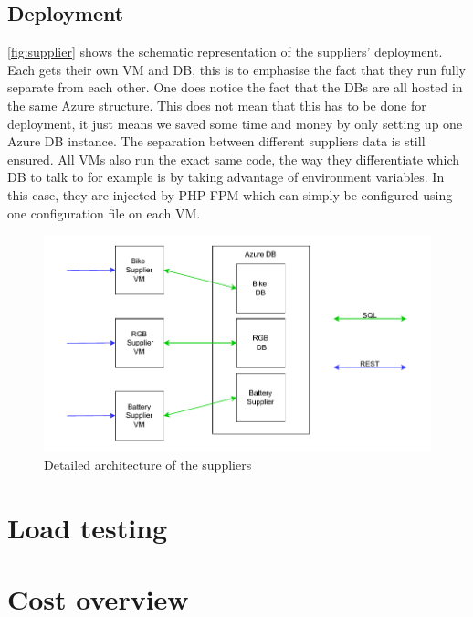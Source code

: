 \documentclass[10pt,a4paper,kul]{kulakarticle} %
\begin{document}
		\subsection{Deployment}
			\autoref{fig:supplier} shows the schematic representation of the suppliers' deployment. Each gets their own VM and DB, this is to emphasise the fact that they run fully separate from each other. One does notice the fact that the DBs are all hosted in the same Azure structure. This does not mean that this has to be done for deployment, it just means we saved some time and money by only setting up one Azure DB instance. The separation between different suppliers data is still ensured. All VMs also run the exact same code, the way they differentiate which DB to talk to for example is by taking advantage of environment variables. In this case, they are injected by PHP-FPM which can simply be configured using one configuration file on each VM. 
			\begin{figure}[h!]
				\centering
				\includegraphics[width=0.7\linewidth]{images/supplier}
				\caption{Detailed architecture of the suppliers}
				\label{fig:supplier}
			\end{figure}
		
	\section{Load testing}


	\section{Cost overview}
	
\end{document}
